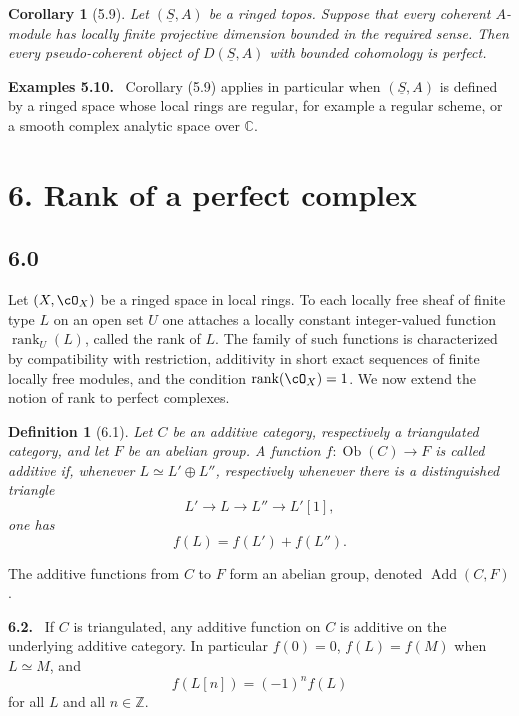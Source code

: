 \documentclass[11pt]{article}
\theoremstyle{plain}
\newtheorem*{corollary*}{Corollary}
\newtheorem*{definition*}{Definition}
\theoremstyle{definition}
\theoremstyle{remark}
\newenvironment{statement}[1]{\par\medskip\noindent\textbf{#1.}\ }{\par\medskip}
\newcommand{\ZZ}{\mathbb Z}
\DeclareMathOperator{\ob}{Ob}
\providecommand{\uS}{\underline{S}}
\providecommand{\Add}{\operatorname{Add}}
\begin{document}
\begin{corollary*}[5.9]
Let $(\uS,A)$ be a ringed topos. Suppose that every coherent $A$-module has locally finite projective dimension bounded in the required sense. Then every pseudo-coherent object of $D(\uS,A)$ with bounded cohomology is perfect.
\end{corollary*}

\begin{statement}{Examples 5.10}
Corollary (5.9) applies in particular when $(\uS,A)$ is defined by a ringed space whose local rings are regular, for example a regular scheme, or a smooth complex analytic space over $\mathbb C$.
\end{statement}

\section*{6. Rank of a perfect complex}

\subsection*{6.0}
Let $(X,\cO_X)$ be a ringed space in local rings. To each locally free sheaf of finite type $L$ on an open set $U$ one attaches a locally constant integer-valued function $\operatorname{rank}_U(L)$, called the rank of $L$. The family of such functions is characterized by compatibility with restriction, additivity in short exact sequences of finite locally free modules, and the condition $\operatorname{rank}(\cO_X)=1$. We now extend the notion of rank to perfect complexes.

\begin{definition*}[6.1]
Let $C$ be an additive category, respectively a triangulated category, and let $F$ be an abelian group. A function $f:\ob(C)\to F$ is called \emph{additive} if, whenever $L\simeq L'\oplus L''$, respectively whenever there is a distinguished triangle
\[
L'\longrightarrow L\longrightarrow L''\longrightarrow L'[1],
\]
one has
\[
f(L)=f(L')+f(L'').
\]
\end{definition*}

The additive functions from $C$ to $F$ form an abelian group, denoted $\Add(C,F)$.

\begin{statement}{6.2}
If $C$ is triangulated, any additive function on $C$ is additive on the underlying additive category. In particular $f(0)=0$, $f(L)=f(M)$ when $L\simeq M$, and
\[
f(L[n])=(-1)^n f(L)
\]
for all $L$ and all $n\in\ZZ$.
\end{statement}
\end{document}
